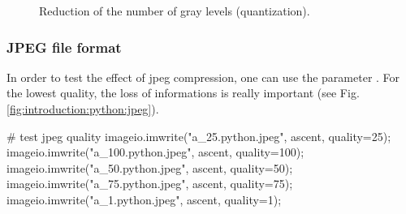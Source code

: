 \begin{figure}[H]
 \centering\caption{Reduction of the number of gray levels (quantization).}
 \hfill
 \hfill
 \label{fig:introduction:python:quantization}%

\end{figure}


\subsubsection{JPEG file format}
In order to test the effect of jpeg compression, one can use the parameter . For the lowest quality, the loss of informations is really important (see Fig.\ref{fig:introduction:python:jpeg}).
\begin{python}
# test jpeg quality
imageio.imwrite("a_25.python.jpeg", ascent, quality=25);
imageio.imwrite("a_100.python.jpeg", ascent, quality=100);
imageio.imwrite("a_50.python.jpeg", ascent, quality=50);
imageio.imwrite("a_75.python.jpeg", ascent, quality=75);
imageio.imwrite("a_1.python.jpeg", ascent, quality=1);
\end{python}

